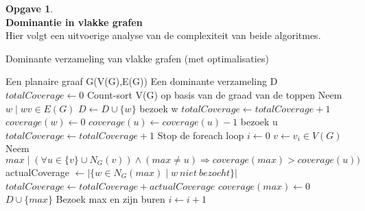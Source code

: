 \documentclass[11pt, a4paper, table]{article}
\makeatletter
\newenvironment{algoritme}[1][H]{%
	\renewcommand{\ALG@name}{Algoritme}%
	\renewcommand{\algorithmicrequire}{\textbf{Input:}}
	\renewcommand{\algorithmicensure}{\textbf{Output:}}
	\begin{algorithm}[#1]%
	}{\end{algorithm}}
\theoremstyle{definition}
\newtheorem{opgave}{Opgave}
\theoremstyle{definition}
\theoremstyle{definition}
\makeatother
\begin{document}
\begin{opgave}\mbox{}\\ 
	\textbf{Dominantie in vlakke grafen}\\
		Hier volgt een uitvoerige analyse van de complexiteit van beide algoritmes. 
		\begin{tcolorbox}[blanker,float=tbp, grow to left by=2cm,grow to right by=2cm]
		\begin{algoritme}
			\caption{Dominante verzameling van vlakke grafen (met optimalisaties)}
			\label{alg:dominance}
			\begin{algorithmic}[1]
				\Require Een planaire graaf G(V(G),E(G))
				\Ensure Een dominante verzameling D
				\State $totalCoverage \gets 0$
				\State Count-sort V(G) op basis van de graad van de toppen\label{sortoperation}
				\label{startoptimalizationloop1}
					\State Neem $w \mid wv \in E(G)$
						\State $D \gets D \cup \{w\}$
						\State bezoek w 
						\State $totalCoverage \gets totalCoverage+1$
						\State $coverage(w) \gets 0$
					\EndIf 
						\State $coverage(u) \gets coverage(u) - 1$
							\State bezoek u
							\State $totalCoverage \gets totalCoverage + 1 $
						\EndIf
					\EndFor
						\State Stop de foreach loop
					\EndIf 
				\EndFor\label{endoptimalizationloop1}
				 \label{startoptimalizationloop2}
					\State $i \gets 0$
					\label{startactualalgorithmloop}
					\State $v \gets v_i \in V(G)$
							\State Neem $max \mid (\forall u \in \{v\} \cup N_G(v)) \land (max \ne u) \Rightarrow coverage(max)>coverage(u))$ \label{neighbourloop1}
								\State actualCoverage $\gets \vert\{w \in N_G(max) \mid w\ niet \  bezocht\}\vert $ \label{neighbourloop2}
									\State $totalCoverage \gets totalCoverage + actualCoverage$
									\State $coverage(max)  \gets 0$
									\State $ D \cup \{max\}$
									\State Bezoek max en zijn buren\label{neighbourloop3}
								\EndIf 
							\EndIf
						\EndIf
						\State $i \gets i+1$
					\EndWhile\label{endactualalgorithmloop}
				\EndFor\label{endoptimalizationloop2}
				
			\end{algorithmic}
		\end{algoritme}
		\end{tcolorbox}


\end{opgave}
\end{document}
